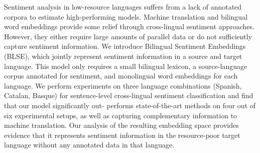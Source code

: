 Sentiment analysis in low-resource languages suffers from a lack of annotated corpora to estimate high-performing models. Machine translation and bilingual word embeddings provide some relief through cross-lingual sentiment approaches. However, they either require large amounts of parallel data or do not sufficiently capture sentiment information. We introduce Bilingual Sentiment Embeddings (BLSE), which jointly represent sentiment information in a source and target language. This model only requires a small bilingual lexicon, a source-language corpus annotated for sentiment, and monolingual word embeddings for each language. We perform experiments on three language combinations (Spanish, Catalan, Basque) for sentence-level cross-lingual sentiment classification and find that our model significantly out- performs state-of-the-art methods on four out of six experimental setups, as well as capturing complementary information to machine translation. Our analysis of the resulting embedding space provides evidence that it represents sentiment information in the resource-poor target language without any annotated data in that language.
